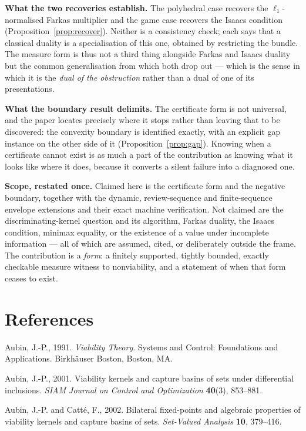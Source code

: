 \documentclass[10pt,twocolumn]{article}
\theoremstyle{definition}
\begin{document}
\textbf{What the two recoveries establish.} The polyhedral case recovers the
\(\ell_{1}\)-normalised Farkas multiplier and the game case recovers the Isaacs condition
(Proposition~\ref{prop:recover}). Neither is a consistency check; each says that a classical
duality is a specialisation of this one, obtained by restricting the bundle. The measure form
is thus not a third thing alongside Farkas and Isaacs duality but the common generalisation
from which both drop out --- which is the sense in which it is the \emph{dual of the
obstruction} rather than a dual of one of its presentations.

\textbf{What the boundary result delimits.} The certificate form is not universal, and the
paper locates precisely where it stops rather than leaving that to be discovered: the convexity
boundary is identified exactly, with an explicit gap instance on the other side of it
(Proposition~\ref{prop:gap}). Knowing when a certificate cannot exist is as much a part of the
contribution as knowing what it looks like where it does, because it converts a silent failure
into a diagnosed one.

\textbf{Scope, restated once.} Claimed here is the certificate form and the negative boundary,
together with the dynamic, review-sequence and finite-sequence envelope extensions and their
exact machine verification. Not claimed are the discriminating-kernel question and its
algorithm, Farkas duality, the Isaacs condition, minimax equality, or the existence of a value
under incomplete information --- all of which are assumed, cited, or deliberately outside the
frame. The contribution is a \emph{form}: a finitely supported, tightly bounded, exactly
checkable measure witness to nonviability, and a statement of when that form ceases to exist.

\section{References}
Aubin, J.-P., 1991. \emph{Viability Theory}. Systems and Control: Foundations and
Applications. Birkh\"auser Boston, Boston, MA.

Aubin, J.-P., 2001. Viability kernels and capture basins of sets under differential
inclusions. \emph{SIAM Journal on Control and Optimization} \textbf{40}(3), 853--881.

Aubin, J.-P. and Catt\'e, F., 2002. Bilateral fixed-points and algebraic properties of
viability kernels and capture basins of sets. \emph{Set-Valued Analysis} \textbf{10},
379--416.
\end{document}
